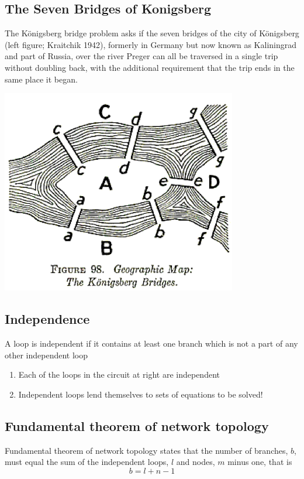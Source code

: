 \documentclass[11pt]{book}
\begin{document}
\subsection{The Seven Bridges of Konigsberg}
The Königsberg bridge problem asks if the seven bridges of the city of Königsberg (left figure; Kraitchik 1942), formerly in Germany but now known as Kaliningrad and part of Russia, over the river Preger can all be traversed in a single trip without doubling back, with the additional requirement that the trip ends in the same place it began.

\begin{center}
	\includegraphics{figures/04.konisberg.png}
\end{center}



\subsection{Independence}
A loop is independent if it contains at least one branch which is not a part of any other independent loop
\begin{enumerate}
	\item Each of the loops in the circuit at right are independent 
	\item Independent loops lend themselves to sets of equations to be solved!
\end{enumerate}

\subsection{Fundamental theorem of network topology}
Fundamental theorem of network topology states that the number of branches, $b$, must equal the sum of the independent loops, $l$ and nodes, $m$ minus one, that is
\begin{equation}
	b = l + n - 1
\end{equation}
\end{document}
